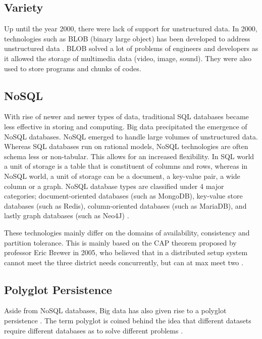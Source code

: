 \subsection{Variety}

Up until the year 2000, there were lack of support for unstructured data. In 2000, technologies such as BLOB (binary large object) has been developed to address unstructured data \cite{Bahrami2015}. BLOB solved a lot of problems of engineers and developers as it allowed the storage of multimedia data (video, image, sound). They were also used to store programs and chunks of codes.

\subsection{NoSQL}

With rise of newer and newer types of data, traditional SQL databases became less effective in storing and computing. Big data precipitated the emergence of NoSQL databases. NoSQL emerged to handle large volumes of unstructured data. Whereas SQL databases run on rational models, NoSQL technologies are often schema less or non-tabular. This allows for an increased flexibility. In SQL world a unit of storage is a table that is constituent of columns and rows, whereas in NoSQL world, a unit of storage can be a document, a key-value pair, a wide column or a graph. NoSQL database types are classified under 4 major categories; document-oriented databases (such as MongoDB), key-value store databases (such as Redis), column-oriented databases (such as MariaDB), and lastly graph databases (such as Neo4J) \cite{Han2011}.

These technologies mainly differ on the domains of availability, consistency and partition tolerance. This is mainly based on the CAP theorem proposed by professor Eric Brewer in 2005, who believed that in a distributed setup system cannot meet the three district needs concurrently, but can at max meet two \cite{Brewer2012}.

\subsection{Polyglot Persistence}

Aside from NoSQL databases, Big data has also given rise to a polyglot persistence \cite{Srivastava2016}. The term polyglot is coined behind the idea that different datasets require different databases as to solve different problems \cite{Sadalage2013}.

